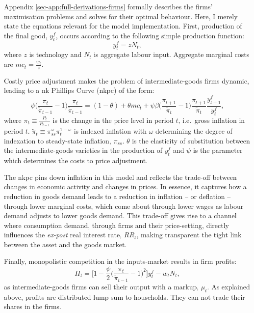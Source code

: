 \documentclass[a4paper,12pt]{article} %
\numberwithin{equation}{section} %
\numberwithin{figure}{section}
\numberwithin{table}{section}
\begin{document}
Appendix \ref{sec-app:full-derivations-firms} formally describes the firms' maximisation problems and solves for their optimal behaviour. Here, I merely state the equations relevant for the model implementation. First, production of the final good, $y_t^f$, occurs according to the following simple production function:
\begin{equation}
    y_t^f = z N_t, \label{eq:firms-production}
\end{equation}
where $z$ is technology and $N_t$ is aggregate labour input. Aggregate marginal costs are $mc_t = \frac{w_t}{z}$. 

Costly price adjustment makes the problem of intermediate-goods firms dynamic, leading to a \Gls{nk} Phillips Curve (\Gls{nkpc}) of the form:
\begin{equation}
    \psi \Bigg( \frac{\pi_t}{\tilde{\pi}_{t-1}} - 1 \Bigg) \frac{\pi_t}{\tilde{\pi}_{t-1}} = (1-\theta) + \theta mc_t + \psi \beta \Bigg( \frac{\pi_{t+1}}{\tilde{\pi}_{t}} - 1 \Bigg) \frac{\pi_{t+1}}{\tilde{\pi}_{t}} \frac{y_{t+1}^f}{y_t^f}, \label{eq:firms-nkpc}
\end{equation}
where $\pi_t \equiv \frac{P_t}{P_{t-1}}$ is the change in the price level in period $t$, i.e.~gross inflation in period $t$. $\tilde{\pi}_t \equiv \pi_{ss}^{\omega} \pi_{t}^{1-\omega}$ is indexed inflation with $\omega$ determining the degree of indexation to steady-state inflation, $\pi_{ss}$. $\theta$ is the elasticity of substitution between the intermediate-goods varieties in the production of $y_t^f$ and $\psi$ is the parameter which determines the costs to price adjustment.  

The \Gls{nkpc} pins down inflation in this model and reflects the trade-off between changes in economic activity and changes in prices. In essence, it captures how a reduction in goods demand leads to a reduction in inflation -- or deflation -- through lower marginal costs, which come about through lower wages as labour demand adjusts to lower goods demand. This trade-off gives rise to a channel where consumption demand, through firms and their price-setting, directly influences the \textit{ex-post} real interest rate, $RR_t$, making transparent the tight link between the asset and the goods market.

Finally, monopolistic competition in the inputs-market results in firm profits:
\begin{equation}
    \Pi_t = \Bigg[ 1 - \frac{\psi}{2} \Bigg( \frac{\pi_t}{\tilde{\pi}_{t-1}} - 1 \Bigg)^2 \Bigg] y_t^f - w_t N_t, \label{eq:firms-profits}
\end{equation}
as intermediate-goods firms can sell their output with a markup, $\mu_t$. As explained above, profits are distributed lump-sum to households. They can not trade their shares in the firms.
\end{document}
